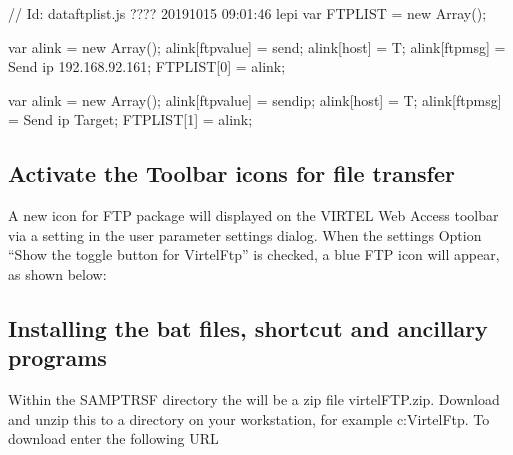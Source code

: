 \documentclass[letterpaper,10pt,english]{sphinxmanual}
\begin{document}
\begin{sphinxVerbatim}[commandchars=\\\{\}]
// \PYGZdl{}Id: dataftplist.js ???? 2019\PYGZhy{}10\PYGZhy{}15 09:01:46 lepi \PYGZdl{}
var FTPLIST = new Array();

var alink = new Array();
alink[\PYGZdq{}ftpvalue\PYGZdq{}] = \PYGZdq{}send\PYGZdq{};
alink[\PYGZdq{}host\PYGZdq{}] = \PYGZdq{}T\PYGZdq{};
alink[\PYGZdq{}ftpmsg\PYGZdq{}] = \PYGZdq{}Send ip 192.168.92.161\PYGZdq{};
FTPLIST[0] = alink;

var alink = new Array();
alink[\PYGZdq{}ftpvalue\PYGZdq{}] = \PYGZdq{}sendip\PYGZdq{};
alink[\PYGZdq{}host\PYGZdq{}] = \PYGZdq{}T\PYGZdq{};
alink[\PYGZdq{}ftpmsg\PYGZdq{}] = \PYGZdq{}Send ip Target\PYGZdq{};
FTPLIST[1] = alink;
\end{sphinxVerbatim}


\subsection{Activate the Toolbar icons for file transfer}
\label{\detokenize{Customization:activate-the-toolbar-icons-for-file-transfer}}
\sphinxAtStartPar
A new icon for FTP package will displayed on the VIRTEL Web Access toolbar via a setting in the user parameter settings dialog. When the settings Option “Show the toggle button for VirtelFtp” is checked, a blue FTP icon will appear, as shown below:

\sphinxAtStartPar
{}

\sphinxAtStartPar
{}


\subsection{Installing the bat files, shortcut and ancillary programs}
\label{\detokenize{Customization:installing-the-bat-files-shortcut-and-ancillary-programs}}
\sphinxAtStartPar
Within the SAMPTRSF directory the will be a zip file virtelFTP.zip. Download and unzip this to a directory on your workstation, for example c:VirtelFtp. To download enter the following URL

\begin{sphinxVerbatim}[commandchars=\\\{\}]
\end{sphinxVerbatim}
\end{document}

